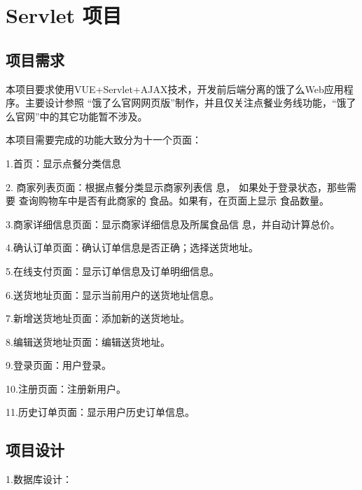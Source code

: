 
\chapter{Servlet 项目}

\section{项目需求}

本项目要求使用VUE+Servlet+AJAX技术，开发前后端分离的饿了么Web应用程序。主要设计参照 “饿了么官网网页版”制作，并且仅关注点餐业务线功能，“饿了么官网”中的其它功能暂不涉及。

本项目需要完成的功能大致分为十一个页面：

1.首页：显示点餐分类信息

2. 商家列表页面：根据点餐分类显示商家列表信
息， 如果处于登录状态，那些需要
查询购物车中是否有此商家的
食品。如果有，在页面上显示
食品数量。

3.商家详细信息页面：显示商家详细信息及所属食品信
息，并自动计算总价。

4.确认订单页面：确认订单信息是否正确；选择送货地址。

5.在线支付页面：显示订单信息及订单明细信息。

6.送货地址页面：显示当前用户的送货地址信息。

7.新增送货地址页面：添加新的送货地址。

8.编辑送货地址页面：编辑送货地址。

9.登录页面：用户登录。

10.注册页面：注册新用户。

11.历史订单页面：显示用户历史订单信息。~\\


\section{项目设计}

1.数据库设计：

